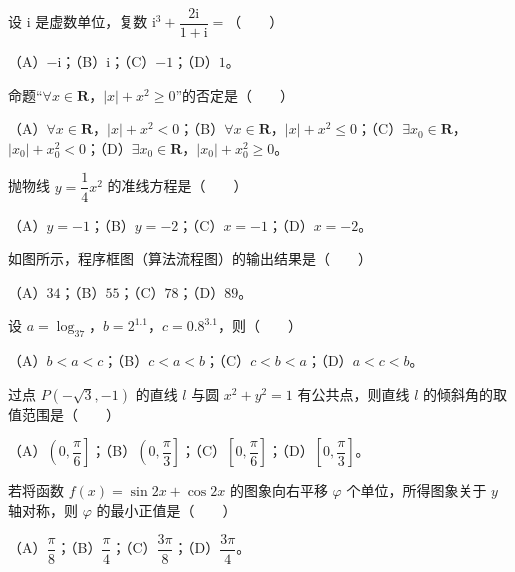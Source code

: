 \begin{question}
设 $\mathrm i$ 是虚数单位，复数 $\mathrm i^3+\dfrac{2\mathrm i}{1+\mathrm i}=$\mbox{（　　）}

（A）$-\mathrm i$；（B）$\mathrm i$；（C）$-1$；（D）$1$。

\end{question}
\begin{question}
命题“$\forall x\in\mathbf R$，$|x|+x^2\geqslant0$”的否定是\mbox{（　　）}

（A）$\forall x\in\mathbf R$，$|x|+x^2<0$；（B）$\forall x\in\mathbf R$，$|x|+x^2\leqslant0$；（C）$\exists x_0\in\mathbf R$，$|x_0|+x_0^2<0$；（D）$\exists x_0\in\mathbf R$，$|x_0|+x_0^2\geqslant0$。

\end{question}
\begin{question}
抛物线 $y=\dfrac14x^2$ 的准线方程是\mbox{（　　）}

（A）$y=-1$；（B）$y=-2$；（C）$x=-1$；（D）$x=-2$。

\Needspace{0.4\textheight}
\end{question}
\begin{question}
如图所示，程序框图（算法流程图）的输出结果是\mbox{（　　）}

（A）$34$；（B）$55$；（C）$78$；（D）$89$。
\nopagebreak[4]
\begin{center}\end{center}
\nopagebreak[4]
\end{question}
\begin{question}
设 $a=\log_37$，$b=2^{1.1}$，$c=0.8^{3.1}$，则\mbox{（　　）}

（A）$b<a<c$；（B）$c<a<b$；（C）$c<b<a$；（D）$a<c<b$。

\end{question}
\begin{question}
过点 $P(-\sqrt3,-1)$ 的直线 $l$ 与圆 $x^2+y^2=1$ 有公共点，则直线 $l$ 的倾斜角的取值范围是\mbox{（　　）}

（A）$\left(0,\dfrac\pi6\right]$；（B）$\left(0,\dfrac\pi3\right]$；（C）$\left[0,\dfrac\pi6\right]$；（D）$\left[0,\dfrac\pi3\right]$。

\end{question}
\begin{question}
若将函数 $f(x)=\sin2x+\cos2x$ 的图象向右平移 $\varphi$ 个单位，所得图象关于 $y$ 轴对称，则 $\varphi$ 的最小正值是\mbox{（　　）}

（A）$\dfrac\pi8$；（B）$\dfrac\pi4$；（C）$\dfrac{3\pi}8$；（D）$\dfrac{3\pi}4$。

\Needspace{0.4\textheight}
\end{question}
